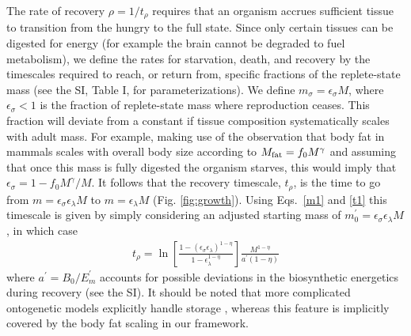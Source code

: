 \documentclass[twocolumn,preprintnumbers,amsmath,amssymb,superscriptaddress]{revtex4}
\begin{document}
{The rate of recovery $\rho = 1/t_\rho$ requires that an organism accrues
sufficient tissue to transition from the hungry to the full state.  Since
only certain tissues can be digested for energy (for example the brain cannot
be degraded to fuel metabolism), we define the rates for starvation, death,
and recovery by the timescales required to reach, or return from, specific
fractions of the replete-state mass (see the SI, Table I, for parameterizations).  We define
$m_{\sigma}=\epsilon_{\sigma} M$, where $\epsilon_{\sigma}<1$ is the fraction of
replete-state mass where reproduction ceases. This fraction will deviate from a constant
if tissue composition systematically scales with adult mass.  For example,
making use of the observation that body fat in mammals scales with overall
body size according to $M_{\rm fat}=f_{0}M^{\gamma}$ and assuming that once
this mass is fully digested the organism starves, this would imply that
$\epsilon_{\sigma}=1-f_{0}M^{\gamma}/M$. It follows that the
recovery timescale, $t_{\rho}$, is the time to go from
$m=\epsilon_{\sigma} \epsilon_{\lambda} M$ to $m=\epsilon_{\lambda}M$ (Fig. \ref{fig:growth}). Using Eqs.~\eqref{m1} and \eqref{t1} this timescale is given by simply considering an adjusted starting mass of $m_{0}^{\prime}=\epsilon_{\sigma}\epsilon_{\lambda}M$, in which case
\begin{eqnarray}
\label{rhotimescale}
t_{\rho}=\ln\left[\frac{1-\left(\epsilon_{\sigma}\epsilon_{\lambda}\right)^{1-\eta}}{1-\epsilon_\lambda^{1-\eta}}\right]\frac{M^{1-\eta}}{a^{\prime}\left(1-\eta\right)}
\end{eqnarray}
where $a^{\prime}=B_{0}/E_{m}^{\prime}$ accounts for possible deviations in
the biosynthetic energetics during recovery (see the SI). It should be noted that more complicated ontogenetic models explicitly handle
storage \citep{hou}, whereas this feature is implicitly covered by the body
fat scaling in our framework.



}
\end{document}

